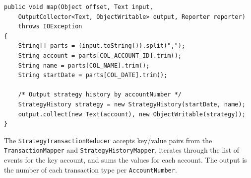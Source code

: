 % 
% 
{
\singlespace
\small
\begin{verbatim}
public void map(Object offset, Text input, 
    OutputCollector<Text, ObjectWritable> output, Reporter reporter)
    throws IOException 
{
    String[] parts = (input.toString()).split(",");
    String account = parts[COL_ACCOUNT_ID].trim();
    String name = parts[COL_NAME].trim();
    String startDate = parts[COL_DATE].trim();

    /* Output strategy history by accountNumber */
    StrategyHistory strategy = new StrategyHistory(startDate, name);
    output.collect(new Text(account), new ObjectWritable(strategy));
}
\end{verbatim}
}
The {\tt StrategyTransactionReducer} accepts key/value pairs from the\\ {\tt TransactionMapper} and {\tt StrategyHistoryMapper}, iterates through the list of events for the key account, and sums the values for each account. The output is the number of each transaction type per {\tt AccountNumber}.
